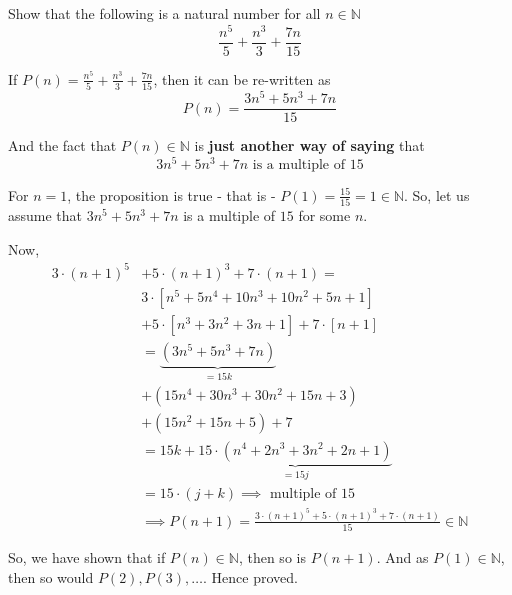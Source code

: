 
\question Show that the following is a natural number for all $n\in\mathbb{N}$
  \[ \frac{n^5}{5} + \frac{n^3}{3} + \frac{7n}{15} \]

\insertQR{}

\begin{solution}
  If $P(n) = \frac{n^5}{5} + \frac{n^3}{3} + \frac{7n}{15}$, then it can be re-written as 
  \[ P(n) = \frac{3n^5 + 5n^3 + 7n}{15} \]

  And the fact that $P(n)\in\mathbb{N}$ is \textbf{just another way of saying} that 
  \[ 3n^5 + 5n^3 + 7n \text{ is a multiple of } 15 \]

  For $n=1$, the proposition is true - that is - $P(1)=\frac{15}{15} = 1\in\mathbb{N}$. 
  So, let us assume that $3n^5+5n^3+7n$ is a multiple of $15$ for some $n$. 

  Now,
  \begin{align}
    3\cdot (n+1)^5 &+ 5\cdot (n+1)^3 + 7\cdot (n+1) = \nonumber \\
    & 3\cdot\left[ n^5 + 5n^4 + 10n^3 + 10n^2 + 5n + 1 \right] \nonumber \\ 
    &+ 5\cdot\left[ n^3+3n^2+3n+ 1 \right] + 7\cdot\left[ n + 1\right] \\
    &= \underbrace{(3n^5 + 5n^3 + 7n)}_{= 15k} \nonumber \\
    &+ (15n^4 + 30n^3 + 30n^2 + 15n + 3) \nonumber \\
    &+ (15n^2 + 15n + 5) + 7 \\
    &= 15k + \underbrace{15\cdot ( n^4 + 2n^3 + 3n^2 + 2n + 1)}_{= 15j } \\
    &= 15\cdot (j + k)\implies\text{ multiple of } 15  \\
    &\implies P(n+1) = \frac{3\cdot(n+1)^5 + 5\cdot(n+1)^3 + 7\cdot(n+1)}{15}\in\mathbb{N}
  \end{align} 

  So, we have shown that if $P(n)\in\mathbb{N}$, then so is $P(n+1)$. And as $P(1)\in\mathbb{N}$, 
  then so would $P(2), P(3),\ldots$. Hence proved.
\end{solution}

